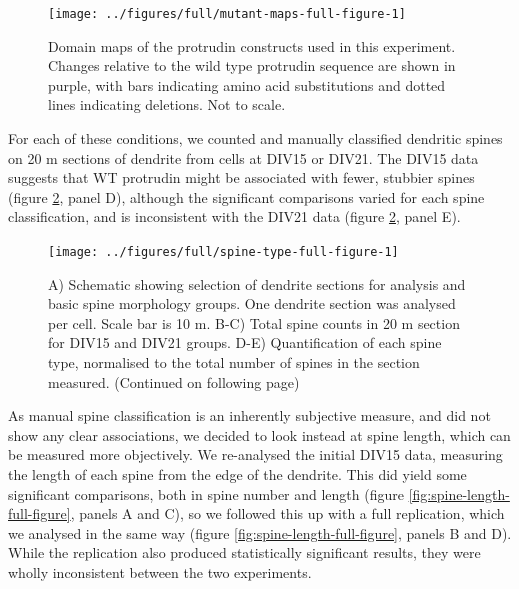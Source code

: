\documentclass[
  12pt,
  a4paper,
]{book}
\begin{document}
\begin{figure}
\texttt{[image: ../figures/full/mutant-maps-full-figure-1]} \caption[Domain maps of protrudin mutants]{Domain maps of the protrudin constructs used in this experiment.   Changes relative to the wild type protrudin sequence are shown in purple, with bars indicating amino acid substitutions and dotted lines indicating deletions.  Not to scale.}\label{fig:mutant-maps-full-figure}
\end{figure}
\vspace{30pt}

For each of these conditions, we counted and manually classified dendritic spines on 20 \textmu{}m sections of dendrite from cells at DIV15 or DIV21. The DIV15 data suggests that WT protrudin might be associated with fewer, stubbier spines (figure \ref{fig:spine-type-full-figure}, panel D), although the significant comparisons varied for each spine classification, and is inconsistent with the DIV21 data (figure \ref{fig:spine-type-full-figure}, panel E).



\begin{figure}
\texttt{[image: ../figures/full/spine-type-full-figure-1]} \caption[Protrudin effect on dendritic spine morphology]{A) Schematic showing selection of dendrite sections for analysis and basic spine morphology groups. One dendrite section was analysed per cell. Scale bar is 10 \textmu{}m. B-C) Total spine counts in 20 \textmu{}m section for DIV15 and DIV21 groups. D-E) Quantification of each spine type, normalised to the total number of spines in the section measured. (Continued on following page)}\label{fig:spine-type-full-figure}
\end{figure}

\begin{figure}
\end{figure}

As manual spine classification is an inherently subjective measure, and did not show any clear associations, we decided to look instead at spine length, which can be measured more objectively. We re-analysed the initial DIV15 data, measuring the length of each spine from the edge of the dendrite. This did yield some significant comparisons, both in spine number and length (figure \ref{fig:spine-length-full-figure}, panels A and C), so we followed this up with a full replication, which we analysed in the same way (figure \ref{fig:spine-length-full-figure}, panels B and D). While the replication also produced statistically significant results, they were wholly inconsistent between the two experiments.
\end{document}
